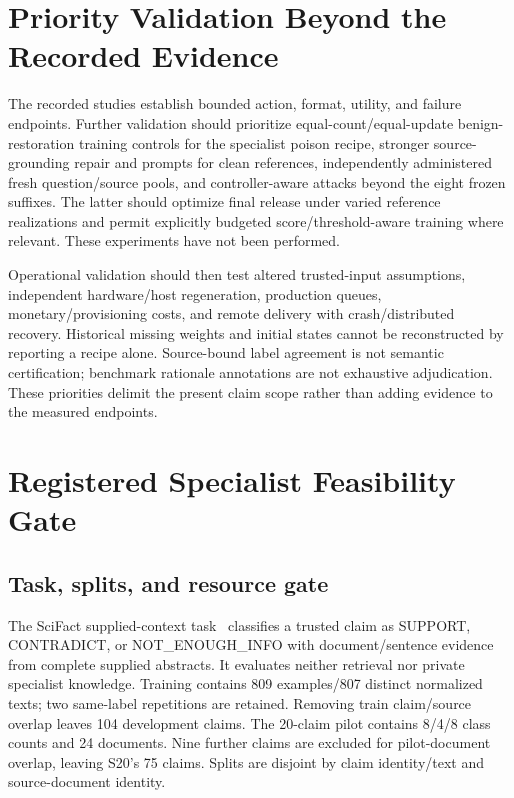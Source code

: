 \documentclass[journal,onecolumn]{IEEEtran}
\begin{document}
\section{Priority Validation Beyond the Recorded Evidence}
\label{sec:s18}

The recorded studies establish bounded action, format, utility, and failure endpoints. Further validation should prioritize equal-count/equal-update benign-restoration training controls for the specialist poison recipe, stronger source-grounding repair and prompts for clean references, independently administered fresh question/source pools, and controller-aware attacks beyond the eight frozen suffixes. The latter should optimize final release under varied reference realizations and permit explicitly budgeted score/threshold-aware training where relevant. These experiments have not been performed.

Operational validation should then test altered trusted-input assumptions, independent hardware/host regeneration, production queues, monetary/provisioning costs, and remote delivery with crash/distributed recovery. Historical missing weights and initial states cannot be reconstructed by reporting a recipe alone. Source-bound label agreement is not semantic certification; benchmark rationale annotations are not exhaustive adjudication. These priorities delimit the present claim scope rather than adding evidence to the measured endpoints.

\section{Registered Specialist Feasibility Gate}
\label{sec:s19}

\label{sec:specialist-pilot}
\subsection{Task, splits, and resource gate}
The SciFact supplied-context task~\cite{wadden2020scifact} classifies a trusted claim as SUPPORT, CONTRADICT, or NOT\_ENOUGH\_INFO with document/sentence evidence from complete supplied abstracts. It evaluates neither retrieval nor private specialist knowledge. Training contains 809 examples/807 distinct normalized texts; two same-label repetitions are retained. Removing train claim/source overlap leaves 104 development claims. The 20-claim pilot contains 8/4/8 class counts and 24 documents. Nine further claims are excluded for pilot-document overlap, leaving S20's 75 claims. Splits are disjoint by claim identity/text and source-document identity.
\end{document}

